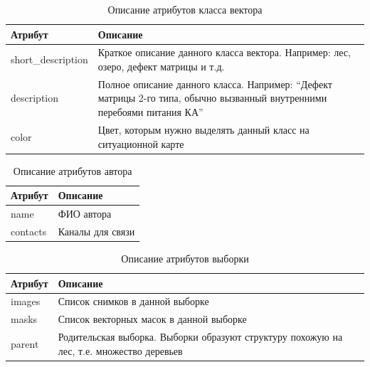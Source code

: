 \documentclass[a4paper]{article}
\begin{document}
\begin{table}[h]
	\begin{tabular}{|C{0.20\textwidth}|p{0.75\textwidth}|}
		\hline
		Атрибут & \centering\arraybackslash Описание \\
		\hline
		short\_description & Краткое описание данного класса вектора. Например: лес, озеро, дефект матрицы и т.д. \\
		\hline
		description & Полное описание данного класса. Например: ``Дефект матрицы 2-го типа, обычно вызванный внутренними перебоями питания КА'' \\
		\hline
		color & Цвет, которым нужно выделять данный класс на ситуационной карте \\
		\hline
	\end{tabular}
	\caption{Описание атрибутов класса вектора}
\end{table}


\begin{table}[h]
	\begin{tabular}{|C{0.20\textwidth}|p{0.75\textwidth}|}
		\hline
		Атрибут & \centering\arraybackslash Описание \\
		\hline
		name & ФИО автора \\
		\hline
		contacts & Каналы для связи \\
		\hline
	\end{tabular}
	\caption{Описание атрибутов автора}
\end{table}


\begin{table}[h]
	\begin{tabular}{|C{0.20\textwidth}|p{0.75\textwidth}|}
		\hline
		Атрибут & \centering\arraybackslash Описание \\
		\hline
		images & Список снимков в данной выборке \\
		\hline
		masks & Список векторных масок в данной выборке \\
		\hline
		parent & Родительская выборка. Выборки образуют структуру похожую на лес, т.е. множество деревьев \\
		\hline
	\end{tabular}
	\caption{Описание атрибутов выборки}
\end{table}
\end{document}
